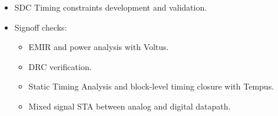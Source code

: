\begin{cventries}
{\begin{cvitems}
\begin{itemize}
          \begin{itemize}
            \item {SDC Timing constraints development and validation.}
            \item {Signoff checks:}
            \begin{itemize}
              \item {EMIR and power analysis with Voltus.}
              \item {DRC verification.}
              \item {Static Timing Analysis and block-level timing closure with Tempus.}
              \item {Mixed signal STA between analog and digital datapath.}
            \end{itemize}
          \end{itemize}
        \end{itemize}
      \end{cvitems}
    }



\end{cventries}
